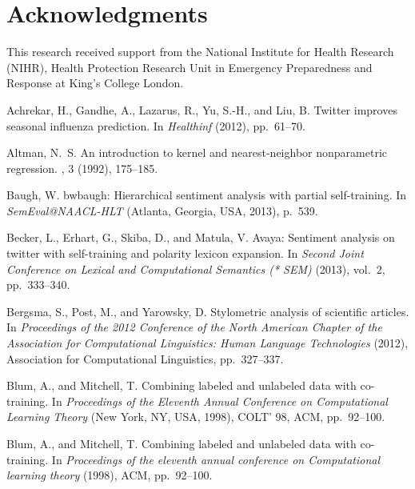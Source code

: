 \documentclass[10pt,letterpaper]{article}
\begin{document}
\section*{Acknowledgments}
This research received support from the National Institute for Health Research (NIHR), Health Protection Research Unit in
Emergency Preparedness and Response at King's College London.

\nolinenumbers

% 
% 
\begin{thebibliography}{10}

{\sc Achrekar, H., Gandhe, A., Lazarus, R., Yu, S.-H., and Liu, B.}
\newblock Twitter improves seasonal influenza prediction.
\newblock In {\em Healthinf\/} (2012), pp.~61--70.

{\sc Altman, N.~S.}
\newblock An introduction to kernel and nearest-neighbor nonparametric
  regression.
, 3 (1992), 175--185.

{\sc Baugh, W.}
\newblock bwbaugh: Hierarchical sentiment analysis with partial self-training.
\newblock In {\em SemEval@NAACL-HLT\/} (Atlanta, Georgia, USA, 2013), p.~539.

{\sc Becker, L., Erhart, G., Skiba, D., and Matula, V.}
\newblock Avaya: Sentiment analysis on twitter with self-training and polarity
  lexicon expansion.
\newblock In {\em Second Joint Conference on Lexical and Computational
  Semantics (* SEM)\/} (2013), vol.~2, pp.~333--340.

{\sc Bergsma, S., Post, M., and Yarowsky, D.}
\newblock Stylometric analysis of scientific articles.
\newblock In {\em Proceedings of the 2012 Conference of the North American
  Chapter of the Association for Computational Linguistics: Human Language
  Technologies\/} (2012), Association for Computational Linguistics,
  pp.~327--337.

{\sc Blum, A., and Mitchell, T.}
\newblock Combining labeled and unlabeled data with co-training.
\newblock In {\em Proceedings of the Eleventh Annual Conference on
  Computational Learning Theory\/} (New York, NY, USA, 1998), COLT' 98, ACM,
  pp.~92--100.

{\sc Blum, A., and Mitchell, T.}
\newblock Combining labeled and unlabeled data with co-training.
\newblock In {\em Proceedings of the eleventh annual conference on
  Computational learning theory\/} (1998), ACM, pp.~92--100.


\end{thebibliography}
\end{document}
